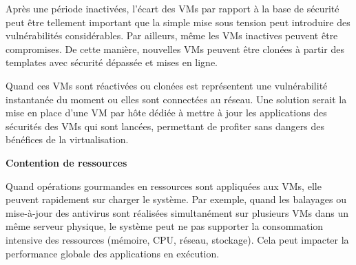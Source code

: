 Après une période inactivées, l'écart des VMs par rapport à la base de sécurité peut être tellement important que la simple mise sous tension peut introduire des vulnérabilités considérables. Par ailleurs, même les VMs inactives peuvent être compromises. De cette manière, nouvelles VMs peuvent être clonées à partir des templates avec sécurité dépassée et mises en ligne.

Quand ces VMs sont réactivées ou clonées est représentent une vulnérabilité instantanée du moment ou elles sont connectées au réseau. Une solution serait la mise en place d'une VM par hôte dédiée à mettre à jour les applications des sécurités des VMs qui sont lancées, permettant de profiter sans dangers des bénéfices de la virtualisation. 

\textbf{Contention de ressources}

Quand opérations gourmandes en ressources sont appliquées aux VMs, elle peuvent rapidement sur charger le système. Par exemple, quand les balayages ou mise-à-jour des antivirus sont réalisées simultanément sur plusieurs VMs dans un même serveur physique, le système peut ne pas supporter la consommation intensive des ressources (mémoire, CPU, réseau, stockage). Cela peut impacter la performance globale des applications en exécution.

